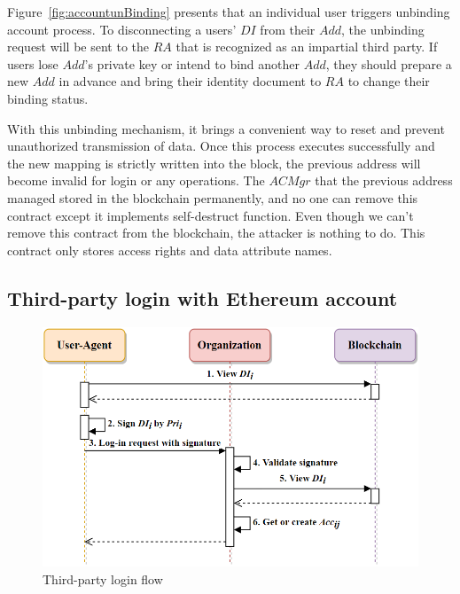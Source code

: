     Figure~\ref{fig:accountunBinding} presents that an individual user triggers unbinding account process. To disconnecting a users' \(DI\) from their \(Add\), the unbinding request will be sent to the \(RA\) that is recognized as an impartial third party. If users lose \(Add\)'s private key or intend to bind another \(Add\), they should prepare a new \(Add\) in advance and bring their identity document to \(RA\) to change their binding status.
    \par 
    With this unbinding mechanism, it brings a convenient way to reset and prevent unauthorized transmission of data. Once this process executes successfully and the new mapping is strictly written into the block, the previous address will become invalid for login or any operations. The \(ACMgr\) that the previous address managed stored in the blockchain permanently, and no one can remove this contract except it implements self-destruct function. Even though we can't remove this contract from the blockchain, the attacker is nothing to do. This contract only stores access rights and data attribute names.

    \newpage

    \subsection{Third-party login with Ethereum account}
    \begin{figure}[htb]
        \centering
        \includegraphics[height=!,width=0.8\linewidth,keepaspectratio=true]{figures/Third_party_login.png}
        \caption{{\footnotesize Third-party login flow}}
        \label{fig:thirdPartyLogin}
    \end{figure}

